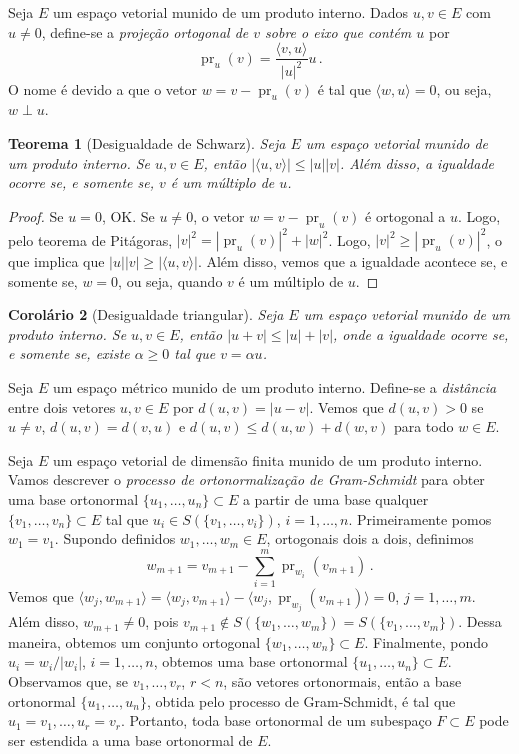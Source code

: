 \documentclass[12pt,a4paper]{article}
\newcommand{\ang}[1]{\langle#1\rangle}
\newtheorem{thm}{Teorema}[section]
\newtheorem{cor}[thm]{Corolário}
\theoremstyle{definition}
\DeclareMathOperator{\pr}{pr}
\begin{document}
Seja $E$ um espaço vetorial munido de um produto interno. Dados
$u,v\in E$ com $u\ne 0$, define-se a \textit{projeção ortogonal de $v$
  sobre o eixo que contém $u$} por
$$\pr_u(v)=\frac{\ang{v,u}}{|u|^2}u\,.$$
O nome é devido a que o vetor $w=v-\pr_u(v)$ é tal que $\ang{w,u}=0$,
ou seja, $w\perp u$.

\begin{thm}[Desigualdade de Schwarz]
  Seja $E$ um espaço vetorial munido de um produto interno. Se
  $u,v\in E$, então $|\ang{u,v}|\le |u||v|$. Além disso, a igualdade
  ocorre se, e somente se, $v$ é um múltiplo de $u$.
\end{thm}
\begin{proof}
  Se $u=0$, OK. Se $u\ne 0$, o vetor $w=v-\pr_u(v)$ é ortogonal a
  $u$. Logo, pelo teorema de Pitágoras,
  $|v|^2=|\pr_u(v)|^2+|w|^2$. Logo, $|v|^2\ge |\pr_u(v)|^2$, o que
  implica que $|u||v|\ge |\ang{u,v}|$. Além disso, vemos que a
  igualdade acontece se, e somente se, $w=0$, ou seja, quando $v$ é um
  múltiplo de $u$.
\end{proof}

\begin{cor}[Desigualdade triangular]
  Seja $E$ um espaço vetorial munido de um produto interno. Se
  $u,v\in E$, então $|u+v|\le |u|+|v|$, onde a igualdade ocorre se, e
  somente se, existe $\alpha\ge 0$ tal que $v=\alpha u$.
\end{cor}

Seja $E$ um espaço métrico munido de um produto interno. Define-se a
\textit{distância} entre dois vetores $u,v\in E$ por
$d(u,v)=|u-v|$. Vemos que $d(u,v)>0$ se $u\ne v$, $d(u,v)=d(v,u)$ e
$d(u,v)\le d(u,w)+d(w,v)$ para todo $w\in E$.

Seja $E$ um espaço vetorial de dimensão finita munido de um produto
interno. Vamos descrever o \textit{processo de ortonormalização de
  Gram-Schmidt} para obter uma base ortonormal
$\{u_1,\ldots,u_n\}\subset E$ a partir de uma base qualquer
$\{v_1,\ldots,v_n\}\subset E$ tal que $u_i\in S(\{v_1,\ldots,v_i\})$,
$i=1,\ldots,n$. Primeiramente pomos $w_1=v_1$. Supondo definidos
$w_1,\ldots,w_m\in E$, ortogonais dois a dois, definimos
$$w_{m+1}=v_{m+1}-\sum_{i=1}^m\pr_{w_i}(v_{m+1})\,.$$
Vemos que
$\ang{w_j,w_{m+1}}=\ang{w_j,v_{m+1}}-\ang{w_j,\pr_{w_j}(v_{m+1})}=0$,
$j=1,\ldots,m$. Além disso, $w_{m+1}\ne 0$, pois
$v_{m+1}\not\in S(\{w_1,\ldots,w_m\})=S(\{v_1,\ldots,v_m\})$. Dessa
maneira, obtemos um conjunto ortogonal $\{w_1,\ldots,w_n\}\subset
E$. Finalmente, pondo $u_i=w_i/|w_i|$, $i=1,\ldots,n$, obtemos uma
base ortonormal $\{u_1,\ldots,u_n\}\subset E$. Observamos que, se
$v_1,\ldots,v_r$, $r<n$, são vetores ortonormais, então a base
ortonormal $\{u_1,\ldots,u_n\}$, obtida pelo processo de Gram-Schmidt,
é tal que $u_1=v_1,\ldots,u_r=v_r$. Portanto, toda base ortonormal de
um subespaço $F\subset E$ pode ser estendida a uma base ortonormal de
$E$.
\end{document}
